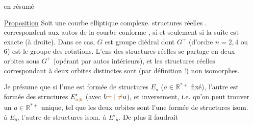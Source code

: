  en résumé

\uline{Proposition} Soit une courbe elliptique  complexe. 
 structures réelles .
 correspondent aux  autos  de la
courbe  conforme , si et seulement
si la suite
est exacte (à droite). Dans ce cas, $G$ est  groupe diédral
 dont $G^+$ (d'ordre $n=2,4$ ou $6$) est le groupe des rotations.
L'ens des structures réelles se partage en deux
orbites sous $G^+$ (opérant par autos intérieurs), et
les structures réelles correspondant à deux orbites
distinctes sont (par définition !) non isomorphes. 

Je présume que si l'une est formée de structures
$E_a$ ($a\in\mathbb R^{*+}$ fixé), l'autre est formée des structures $E'_{\unsure{a|b}}$
(avec $b\unsure{=|\ne}a$), et inversement, i.e. qu'on peut trouver
un $a\in\mathbb R^{*+}$ unique, tel que les deux orbites sont
l'une formée de structures isom. à $E_a$, l'autre de
structures isom. à $E'_a$. De plus il faudrait

